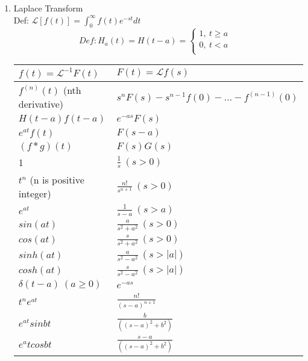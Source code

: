 \documentclass[10pt]{article}
\newcommand{\Lap}{\mathcal{L}}
\begin{document}
\begin{multicols}{2}
\begin{enumerate}
	\item Laplace Transform\\
	Def: $\Lap[f(t)] = \int_{0}^{\infty}f(t)e^{-st}dt$\\
	\begin{equation}
	Def: H_a(t) = H(t-a) = 
	\left\{
	\begin{array}{lr}
	1, \ t \ge a&\\
	0, \ t < a\\
	\end{array}
	\right.
	\end{equation}
	\begin{center}
		\begin{tabular}{|l l|} \hline
		$f(t) = \Lap^{-1}F (t)$		& $F (t) = \Lap f(s)$ \\ \hline
		$f^{(n)}(t)$ (nth derivative)	& $s^n F(s)-s^{n-1}f(0) - \dots - f^{(n-1)}(0)$  \\
		$H(t-a)f(t-a)$	& $e^{-as}F(s)$ \\
		$e^{at}f(t)$	& $F(s-a)$ \\
		$(f*g)(t)$ 		& $F(s)G(s)$ \\
		1 				& $\frac{1}{s} \ (s > 0)$ \\
		$t^n$ (n is positive integer) & $\frac{n!}{s^{n+1}} \ (s>0) $\\
		$e^{at}$ 			& $ \frac{1}{s-a} \ (s > a)$ \\
		$sin(at)$ 		& $\frac{a}{s^2+a^2} \ (s > 0)$ \\
		$cos(at)$		& $\frac{s}{s^2+a^2} \ (s > 0)$ \\
		$sinh(at)$		& $\frac{a}{s^2-a^2} \ (s > |a|)$ \\
		$cosh(at)$		& $\frac{s}{s^2-a^2} \ (s > |a|)$ \\
		$\delta(t-a) \ (a \ge 0)$ & $e^{-as}$ \\
		$t^ne^{at}$ 	& $\frac{n!}{(s-a)^{n+1}}$ \\
		$e^{at}sinbt$ 	& $\frac{b}{((s-a)^2 + b^2)}$ \\
		$e^atcosbt$		& $\frac{s-a}{((s-a)^2 + b^2)}$ \\ \hline
		\end{tabular}
	\end{center}
	
		
		
\end{enumerate}
\newpage
\end{multicols}
\end{document}
